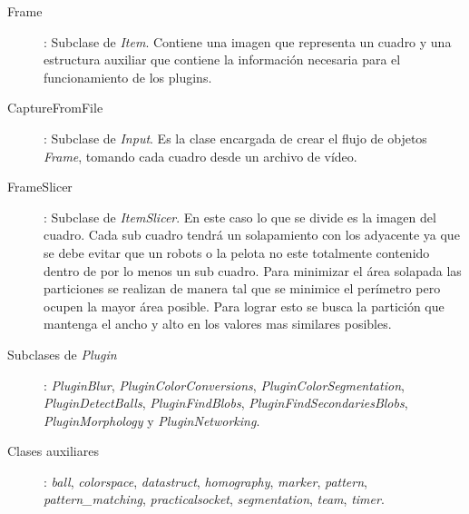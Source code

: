 \begin{description}

\item[Frame]: Subclase de \emph{Item}. Contiene una imagen que representa un
	cuadro y una estructura auxiliar que contiene la información necesaria
	para el funcionamiento de los plugins.

\item[CaptureFromFile]: Subclase de \emph{Input}. Es la clase encargada de crear
	el flujo de objetos \emph{Frame}, tomando cada cuadro desde un archivo
	de vídeo.

\item[FrameSlicer]: Subclase de \emph{ItemSlicer}. En este caso lo que se divide
	es la imagen del cuadro. Cada sub cuadro tendrá un solapamiento con los
	adyacente ya que se debe evitar que un robots o la pelota no este
	totalmente contenido dentro de por lo menos un sub cuadro. Para
	minimizar el área solapada las particiones se realizan de manera tal que
	se minimice el perímetro pero ocupen la mayor área posible. Para lograr
	esto se busca la partición que mantenga el ancho y alto en los valores
	mas similares posibles.

\item[Subclases de \emph{Plugin}]: \emph{PluginBlur},
	\emph{PluginColorConversions}, \emph{PluginColorSegmentation},
	\emph{PluginDetectBalls}, \emph{PluginFindBlobs},
	\emph{PluginFindSecondariesBlobs}, \emph{PluginMorphology} y
	\emph{PluginNetworking}.

\item[Clases auxiliares]: \emph{ball}, \emph{colorspace}, \emph{datastruct},
	\emph{homography}, \emph{marker}, \emph{pattern},
	\emph{pattern\_matching}, \emph{practicalsocket}, \emph{segmentation},
	\emph{team}, \emph{timer}.

\end{description}
